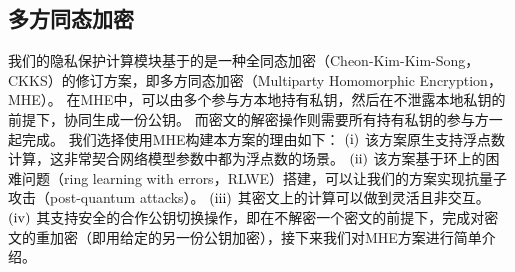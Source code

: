 \subsection{多方同态加密}
我们的隐私保护计算模块基于的是一种全同态加密（Cheon-Kim-Kim-Song，CKKS\cite{cheon2017homomorphic}）的修订方案，即多方同态加密（Multiparty Homomorphic Encryption，MHE）。
在MHE中，可以由多个参与方本地持有私钥，然后在不泄露本地私钥的前提下，协同生成一份公钥。
而密文的解密操作则需要所有持有私钥的参与方一起完成。
我们选择使用MHE构建本方案的理由如下：
$(\rm \romannumeral1)$ 该方案原生支持浮点数计算，这非常契合网络模型参数中都为浮点数的场景。
$(\rm \romannumeral2)$ 该方案基于环上的困难问题（ring learning with errors，RLWE）搭建，可以让我们的方案实现抗量子攻击（post-quantum attacks）。
$(\rm \romannumeral3)$ 其密文上的计算可以做到灵活且非交互。
$(\rm \romannumeral4)$ 其支持安全的合作公钥切换操作，即在不解密一个密文的前提下，完成对密文的重加密（即用给定的另一份公钥加密），接下来我们对MHE方案进行简单介绍。

